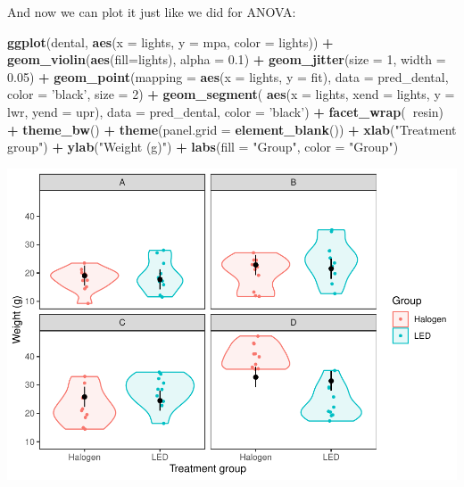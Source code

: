 \documentclass[
]{book}
\newenvironment{Shaded}{\begin{snugshade}}{\end{snugshade}}
\newcommand{\DataTypeTok}[1]{\textcolor[rgb]{0.13,0.29,0.53}{#1}}
\newcommand{\DecValTok}[1]{\textcolor[rgb]{0.00,0.00,0.81}{#1}}
\newcommand{\FloatTok}[1]{\textcolor[rgb]{0.00,0.00,0.81}{#1}}
\newcommand{\KeywordTok}[1]{\textcolor[rgb]{0.13,0.29,0.53}{\textbf{#1}}}
\newcommand{\NormalTok}[1]{#1}
\newcommand{\OperatorTok}[1]{\textcolor[rgb]{0.81,0.36,0.00}{\textbf{#1}}}
\newcommand{\StringTok}[1]{\textcolor[rgb]{0.31,0.60,0.02}{#1}}
\begin{document}
And now we can plot it just like we did for ANOVA:

\begin{Shaded}
\begin{Highlighting}[]
\KeywordTok{ggplot}\NormalTok{(dental, }\KeywordTok{aes}\NormalTok{(}\DataTypeTok{x =}\NormalTok{ lights, }\DataTypeTok{y =}\NormalTok{ mpa, }\DataTypeTok{color =}\NormalTok{ lights)) }\OperatorTok{+}
\StringTok{  }\KeywordTok{geom_violin}\NormalTok{(}\KeywordTok{aes}\NormalTok{(}\DataTypeTok{fill=}\NormalTok{lights), }\DataTypeTok{alpha =} \FloatTok{0.1}\NormalTok{) }\OperatorTok{+}
\StringTok{  }\KeywordTok{geom_jitter}\NormalTok{(}\DataTypeTok{size =} \DecValTok{1}\NormalTok{, }\DataTypeTok{width =} \FloatTok{0.05}\NormalTok{) }\OperatorTok{+}
\StringTok{  }\KeywordTok{geom_point}\NormalTok{(}\DataTypeTok{mapping =} \KeywordTok{aes}\NormalTok{(}\DataTypeTok{x =}\NormalTok{ lights, }\DataTypeTok{y =}\NormalTok{ fit), }
             \DataTypeTok{data =}\NormalTok{ pred_dental,}
             \DataTypeTok{color =} \StringTok{'black'}\NormalTok{,}
             \DataTypeTok{size =} \DecValTok{2}\NormalTok{) }\OperatorTok{+}
\StringTok{  }\KeywordTok{geom_segment}\NormalTok{(}
    \KeywordTok{aes}\NormalTok{(}\DataTypeTok{x =}\NormalTok{ lights, }\DataTypeTok{xend =}\NormalTok{ lights, }\DataTypeTok{y =}\NormalTok{ lwr, }\DataTypeTok{yend =}\NormalTok{ upr),}
    \DataTypeTok{data =}\NormalTok{ pred_dental,}
    \DataTypeTok{color =} \StringTok{'black'}\NormalTok{) }\OperatorTok{+}\StringTok{  }
\StringTok{  }\KeywordTok{facet_wrap}\NormalTok{(}\OperatorTok{~}\NormalTok{resin) }\OperatorTok{+}
\StringTok{  }\KeywordTok{theme_bw}\NormalTok{() }\OperatorTok{+}
\StringTok{  }\KeywordTok{theme}\NormalTok{(}\DataTypeTok{panel.grid =} \KeywordTok{element_blank}\NormalTok{()) }\OperatorTok{+}
\StringTok{  }\KeywordTok{xlab}\NormalTok{(}\StringTok{"Treatment group"}\NormalTok{) }\OperatorTok{+}
\StringTok{  }\KeywordTok{ylab}\NormalTok{(}\StringTok{"Weight (g)"}\NormalTok{) }\OperatorTok{+}
\StringTok{  }\KeywordTok{labs}\NormalTok{(}\DataTypeTok{fill =} \StringTok{"Group"}\NormalTok{, }\DataTypeTok{color =} \StringTok{"Group"}\NormalTok{)}
\end{Highlighting}
\end{Shaded}

\includegraphics{worstr_files/figure-latex/unnamed-chunk-270-1.pdf}
\end{document}
